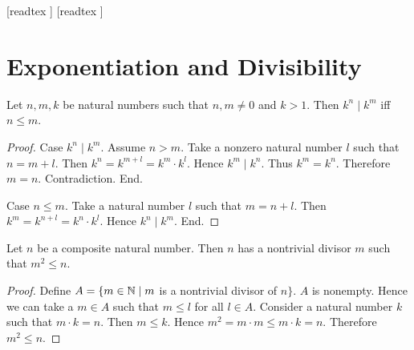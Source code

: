 \documentclass[10pt]{article}
\begin{document}
  \begin{imports}
    \begin{forthel}
      [readtex ]
      [readtex ]
    \end{forthel}
  \end{imports}


  \section*{Exponentiation and Divisibility}

  \begin{forthel}
    \begin{proposition}[id=ARITHMETIC_13_8426075493236736,printid]
      Let $n, m, k$ be natural numbers such that $n, m \neq 0$ and $k > 1$.
      Then $k^{n} \mid k^{m}$ iff $n \leq m$.
    \end{proposition}
    \begin{proof}
      Case $k^{n} \mid k^{m}$.
        Assume $n > m$.
        Take a nonzero natural number $l$ such that $n = m + l$.
        Then $k^{n}
          = k^{m + l}
          = k^{m} \cdot k^{l}$.
        Hence $k^{m} \mid k^{n}$.
        Thus $k^{m} = k^{n}$.
        Therefore $m = n$.
        Contradiction.
      End.
  
      Case $n \leq m$.
        Take a natural number $l$ such that $m = n + l$.
        Then $k^{m}
          = k^{n + l}
          = k^{n} \cdot k^{l}$.
        Hence $k^{n} \mid k^{m}$.
      End.
    \end{proof}
  \end{forthel}
  
  \begin{forthel}
    \begin{proposition}[id=ARITHMETIC_13_797196163219456,printid]
      Let $n$ be a composite natural number.
      Then $n$ has a nontrivial divisor $m$ such that $m^{2} \leq n$.
    \end{proposition}
    \begin{proof}
      Define $A = \{ m \in \mathbb{N} \mid m$ is a nontrivial divisor of $n \}$.
      $A$ is nonempty.
      Hence we can take a $m \in A$ such that $m \leq l$ for all $l \in A$.
      Consider a natural number $k$ such that $m \cdot k = n$.
      Then $m \leq k$.
      Hence $m^{2} = m \cdot m \leq m \cdot k = n$.
      Therefore $m^{2} \leq n$.
    \end{proof}
  \end{forthel}
\end{document}
